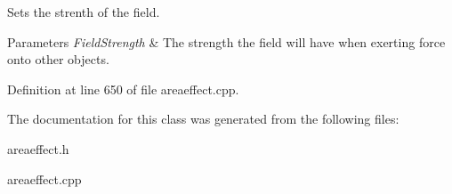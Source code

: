 Sets the strenth of the field. 


\begin{DoxyParams}{Parameters}
{\em FieldStrength} & The strength the field will have when exerting force onto other objects. \\
\hline
\end{DoxyParams}


Definition at line 650 of file areaeffect.cpp.



The documentation for this class was generated from the following files:\begin{DoxyCompactItemize}
\item 
areaeffect.h\item 
areaeffect.cpp\end{DoxyCompactItemize}

